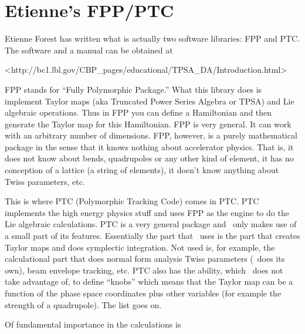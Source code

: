 \chapter{Etienne's FPP/PTC}
\label{c:etienne}

Etienne Forest has written what is actually two software libraries:
FPP and PTC. The software and a manual can be obtained at
\begin{example} 
    <http://bc1.lbl.gov/CBP_pages/educational/TPSA_DA/Introduction.html>
\end{example}

FPP stands for ``Fully Polymorphic Package.'' What this library does
is implement Taylor maps (aka Truncated Power Series Algebra or TPSA)
and Lie algebraic operations. Thus in FPP you can define a Hamiltonian
and then generate the Taylor map for this Hamiltonian. FPP is very
general. It can work with an arbitrary number of dimensions.  FPP,
however, is a purely mathematical package in the sense that it knows
nothing about accelerator physics. That is, it does not know about
bends, quadrupoles or any other kind of element, it has no conception
of a lattice (a string of elements), it doen't know anything about
Twiss parameters, etc.

This is where PTC (Polymorphic Tracking Code) comes in PTC. PTC
implements the high energy physics stuff and uses FPP as the engine to
do the Lie algebraic calculations.  PTC is a very general package and
\bmad\ only makes use of a small part of its features. Essentially
the part that \bmad\ uses is the part that creates Taylor maps and
does symplectic integration. Not used is, for example, the
calculational part that does normal form analysis Twiss parameters
(\bmad\ does its own), beam envelope tracking, etc. PTC also has the
ability, which \bmad\ does not take advantage of, to define ``knobs''
which means that the Taylor map can be a function of the phase space
coordinates plus other variables (for example the strength of a
quadrupole). The list goes on.


Of fundamental importance in
the calculations is




